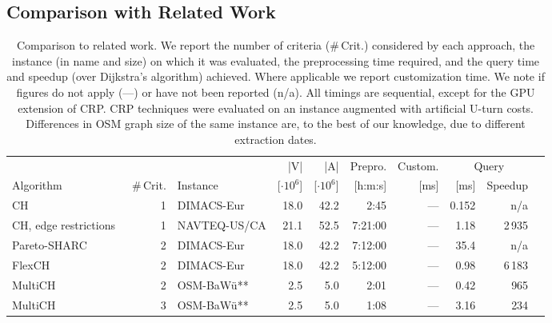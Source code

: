 \documentclass{sig-alternate}
\begin{document}
\subsection{Comparison with Related Work}
\begin{table*}
\caption{\label{tab:related} Comparison to related work. We report the number of criteria (\#\,Crit.) considered by each approach, the instance (in name and size) on which it was evaluated, the preprocessing time required, and the query time and speedup (over Dijkstra's algorithm) achieved. Where applicable we report customization time. We note if figures do not apply (---) or have not been reported (n/a). All timings are sequential, except for the GPU extension of CRP. CRP techniques were evaluated on an instance augmented with artificial U-turn costs. Differences in OSM graph size of the same instance are, to the best of our knowledge, due to different extraction dates.
}
\begin{centering}
\begin{tabular}{lrlrrrrrrr}
\toprule
 & & & |V|& |A| &Prepro.& Custom. & \multicolumn{2}{c}{Query}\\
Algorithm & \#\,Crit.  & Instance & [$\cdot 10^6$]& [$\cdot 10^6$]& [h:m:s] & [ms] & [ms] & Speedup\\
\midrule
CH~\cite{gssv-erlrn-12} & 1  & DIMACS-Eur &  18.0 & 42.2 & 2:45 & --- & 0.152 & n/a\\
CH, edge restrictions~\cite{DBLP:journals/jea/GeisbergerRST12} & 1  & NAVTEQ-US/CA  & 21.1 & 52.5 & 7:21:00 &--- & 1.18\phantom{0} & 2\,935\phantom{.0}\\
Pareto-SHARC~\cite{dw-pps-09} & 2  & DIMACS-Eur &  18.0 & 42.2 & 7:12:00 & --- & 35.4\phantom{00} & n/a \\
FlexCH~\cite{gks-rpfof-10} & 2  & DIMACS-Eur & 18.0 & 42.2 & 5:12:00 & --- & 0.98\phantom{0} & 6\,183\phantom{.0}\\
MultiCH~\cite{fs-pcchm-13} & 2  & OSM-BaWü** & 2.5 & 5.0 & 2:01 & ---  & 0.42\phantom{0} & 965\phantom{.0}\\
MultiCH~\cite{fs-pcchm-13} & 3  & OSM-BaWü** & 2.5 & 5.0 & 1:08 & --- & 3.16\phantom{0} & 234\phantom{.0}\\


\end{tabular}
\end{centering}
\end{table*}
\end{document}
